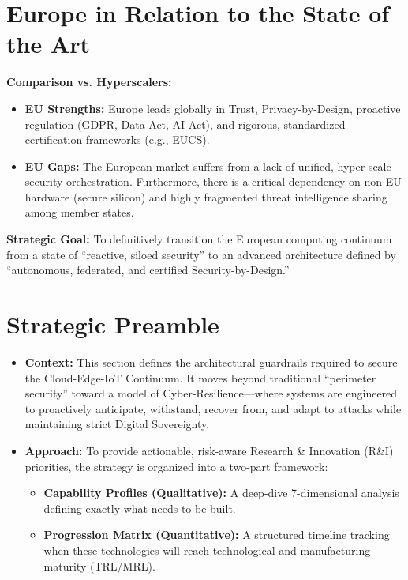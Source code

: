 \documentclass[11pt,a4paper]{article}
\begin{document}
\section{Europe in Relation to the State of the Art}
\textbf{Comparison vs. Hyperscalers:}
\begin{itemize}
    \item \textbf{EU Strengths:} Europe leads globally in Trust, Privacy-by-Design, proactive regulation (GDPR, Data Act, AI Act), and rigorous, standardized certification frameworks (e.g., EUCS).
    \item \textbf{EU Gaps:} The European market suffers from a lack of unified, hyper-scale security orchestration. Furthermore, there is a critical dependency on non-EU hardware (secure silicon) and highly fragmented threat intelligence sharing among member states.
\end{itemize}
\textbf{Strategic Goal:} To definitively transition the European computing continuum from a state of ``reactive, siloed security'' to an advanced architecture defined by ``autonomous, federated, and certified Security-by-Design.''

\section{Strategic Preamble}
\begin{itemize}
    \item \textbf{Context:} This section defines the architectural guardrails required to secure the Cloud-Edge-IoT Continuum. It moves beyond traditional ``perimeter security'' toward a model of Cyber-Resilience---where systems are engineered to proactively anticipate, withstand, recover from, and adapt to attacks while maintaining strict Digital Sovereignty.
    \item \textbf{Approach:} To provide actionable, risk-aware Research \& Innovation (R\&I) priorities, the strategy is organized into a two-part framework:
    \begin{itemize}
        \item \textbf{Capability Profiles (Qualitative):} A deep-dive 7-dimensional analysis defining exactly what needs to be built.
        \item \textbf{Progression Matrix (Quantitative):} A structured timeline tracking when these technologies will reach technological and manufacturing maturity (TRL/MRL).
    \end{itemize}
\end{itemize}
\end{document}
